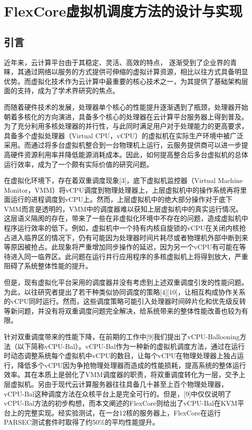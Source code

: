 
\chapter{FlexCore虚拟机调度方法的设计与实现}
\label{chap:flexcore}



\section{引言}

近年来，云计算平台由于其稳定、灵活、高效的特点， 逐渐受到了企业界的青睐，其通过网络以服务的方式提供可伸缩的虚拟计算资源，相比以往方式具备明显优势。而虚拟化技术作为云计算中最重要的核心技术之一，为其提供了基础架构层面的支持，成为了学术界研究的焦点。

而随着硬件技术的发展，处理器单个核心的性能提升逐渐遇到了瓶颈，处理器开始朝着多核化的方向演进，具备多个核心的处理器在云计算平台服务器上得到普及。为了充分利用多核处理器的并行性，与此同时满足用户对于处理能力的更高要求，具备多个虚拟处理器（Virtual CPU，vCPU）的虚拟机在实际生产环境中被广泛采用。而通过将多台虚拟机整合到一台物理机上运行，云服务提供商可以进一步提高硬件资源利用率并降低能源消耗成本。因此，如何提高整合后多台虚拟机的总体运行效率，成为了一个颇有实际价值的研究问题。

在虚拟化环境下，存在着双重调度现象[3]，底下虚拟机监控器（Virtual Machine Monitor，VMM）将vCPU调度到物理处理器上，上层虚拟机中的操作系统再将里面运行的进程调度到vCPU上。然而，上层虚拟机中的绝大部分操作对于底下VMM而言是透明的，VMM中的调度器难以获知上层虚拟机中的真实运行情况。这层语义隔阂的存在，带来了一些在非虚拟化环境中不存在的问题，造成虚拟机中程序运行效率的低下。例如，虚拟机中一个持有内核自旋锁的vCPU在关闭内核抢占进入临界区的情况下，仍有可能因为处理器时间片耗尽或者物理机外部中断到来等原因被抢占。此现象将严重增加同步操作的延迟，因为另一个vCPU有可能在等待进入同一临界区。此问题在运行并行应用程序的多核虚拟机上将得到放大，严重阻碍了系统整体性能的提升。

但是，现有虚拟化平台采用的调度器并没有考虑到上述双重调度引发的性能问题。为此，以往研究者提出了若干种类似协同调度的策略[4][10]，让相互构成协作关系的vCPU同时运行。然而，这些调度策略可能引入处理器时间碎片化和优先级反转等新问题，并没有将双重调度问题完全解决，给系统带来的整体性能改善也较为有限。

针对双重调度带来的性能下降，在前期的工作中[9]我们提出了vCPU-Ballooning方法（以下简称vCPU-Bal）。vCPU-Bal作为一种新的虚拟机调度方法，通过在运行时动态调整系统每个虚拟机中vCPU的数目，让每个vCPU在物理处理器上独占运行，降低多个vCPU因为争抢物理处理器而造成的性能损耗，提高系统的整体运行效率。其在本质上是弱化了VMM调度器的职责，将双重调度转化为一层，交予上层虚拟机。另由于现代云计算服务器往往具备几十甚至上百个物理处理器，vCPU-Bal这种调度方法在众核平台上是完全可行的。但是，[9]中仅仅说明了vCPU-Bal方法的初步构想，而本文阐述的FlexCore则给出了vCPU-Bal在KVM平台上的完整实现。经实验测试，在一台12核的服务器上，FlexCore在运行PARSEC测试套件时取得了约50\%的平均性能提升。

